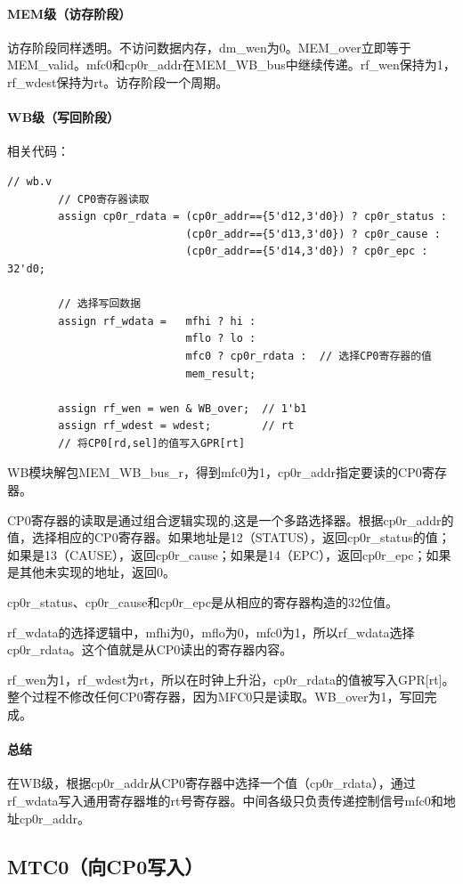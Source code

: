 \documentclass[a4paper]{article}
\begin{document}
	\paragraph{MEM级（访存阶段）}
	访存阶段同样透明。不访问数据内存，dm\_wen为0。MEM\_over立即等于MEM\_valid。mfc0和cp0r\_addr在MEM\_WB\_bus中继续传递。rf\_wen保持为1，rf\_wdest保持为rt。访存阶段一个周期。
	\paragraph{WB级（写回阶段）}
	相关代码：
	\begin{lstlisting}[caption={WB}]
		// wb.v
		// CP0寄存器读取
		assign cp0r_rdata = (cp0r_addr=={5'd12,3'd0}) ? cp0r_status :
							(cp0r_addr=={5'd13,3'd0}) ? cp0r_cause :
							(cp0r_addr=={5'd14,3'd0}) ? cp0r_epc : 32'd0;
		
		// 选择写回数据
		assign rf_wdata =   mfhi ? hi :
							mflo ? lo :
							mfc0 ? cp0r_rdata :  // 选择CP0寄存器的值
							mem_result;
		
		assign rf_wen = wen & WB_over;  // 1'b1
		assign rf_wdest = wdest;        // rt
		// 将CP0[rd,sel]的值写入GPR[rt]
	\end{lstlisting}
	WB模块解包MEM\_WB\_bus\_r，得到mfc0为1，cp0r\_addr指定要读的CP0寄存器。
	
	CP0寄存器的读取是通过组合逻辑实现的,这是一个多路选择器。根据cp0r\_addr的值，选择相应的CP0寄存器。如果地址是12（STATUS），返回cp0r\_status的值；如果是13（CAUSE），返回cp0r\_cause；如果是14（EPC），返回cp0r\_epc；如果是其他未实现的地址，返回0。
	
	cp0r\_status、cp0r\_cause和cp0r\_epc是从相应的寄存器构造的32位值。
	
	rf\_wdata的选择逻辑中，mfhi为0，mflo为0，mfc0为1，所以rf\_wdata选择cp0r\_rdata。这个值就是从CP0读出的寄存器内容。
	
	rf\_wen为1，rf\_wdest为rt，所以在时钟上升沿，cp0r\_rdata的值被写入GPR[rt]。
	整个过程不修改任何CP0寄存器，因为MFC0只是读取。WB\_over为1，写回完成。
	\paragraph{总结}
	在WB级，根据cp0r\_addr从CP0寄存器中选择一个值（cp0r\_rdata），通过rf\_wdata写入通用寄存器堆的rt号寄存器。中间各级只负责传递控制信号mfc0和地址cp0r\_addr。
	
	\subsection{MTC0（向CP0写入）}
\end{document}
